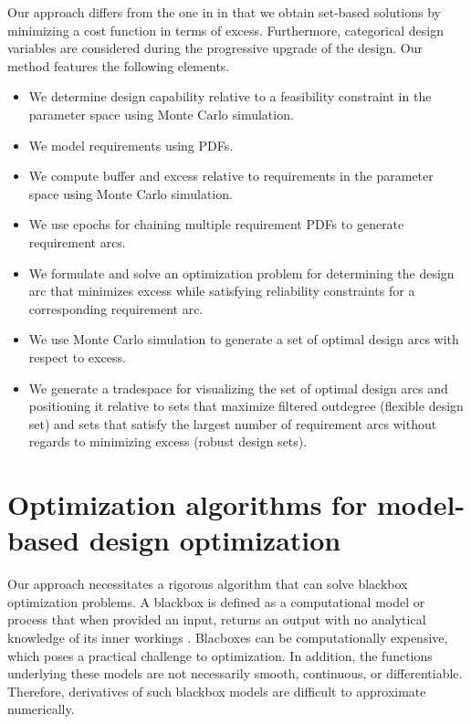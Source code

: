 Our approach differs from the one in \cite{Cardin2017} in that we obtain set-based solutions by minimizing a cost function in terms of excess. Furthermore, categorical design variables are considered during the progressive upgrade of the design. 
%
Our method features the following elements.
\begin{itemize}
	\item We determine design capability relative to a feasibility constraint in the parameter space using Monte Carlo simulation.
	\item We model requirements using \acp{PDF}.
	\item We compute buffer and excess relative to requirements in the parameter space using Monte Carlo simulation.
	\item We use epochs for chaining multiple requirement \acp{PDF} to generate requirement arcs.
	\item We formulate and solve an optimization problem \cite{Rapp2018} for determining the design arc that minimizes excess while satisfying reliability constraints for a corresponding requirement arc.
	\item We use Monte Carlo simulation to generate a set of optimal design arcs with respect to excess.
	\item We generate a tradespace for visualizing the set of optimal design arcs and positioning it relative to sets that maximize filtered outdegree (flexible design set) and sets that satisfy the largest number of requirement arcs without regards to minimizing excess (robust design sets).
\end{itemize}
 
\section{Optimization algorithms for model-based design optimization} 
\label{sec:optLR}

Our approach necessitates a rigorous algorithm that can solve blackbox optimization problems. A blackbox is defined as a computational model or process that when provided an input, returns an output with no analytical knowledge of its inner workings \cite{Audet2017}. Blacboxes can be computationally expensive, which poses a practical challenge to optimization. In addition, the functions underlying these models are not necessarily smooth, continuous, or differentiable. Therefore, derivatives of such blackbox models are difficult to approximate numerically. 

